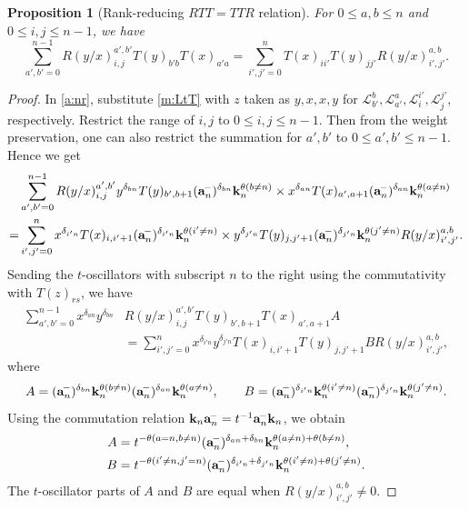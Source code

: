 \documentclass[11pt]{article}
\newtheorem{prop}[theo]{Proposition}
\theoremstyle{definition}
\numberwithin{equation}{section}
\newcommand{\am}{{\rm\aaa}^{\!-} }
\newcommand{\aaa}{\mathbf{a}}
\newcommand{\kk}{\mathbf{k}}
\begin{document}
\begin{prop}[Rank-reducing $RTT=TTR$ relation]\label{a:pr:rr}
For $0 \le a,b \le n$ and $0 \le i,j \le n-1$, we have
\begin{equation}\label{a:rrr}
\sum_{a',b'=0}^{n-1}R(y/x)_{i, j}^{a', b'}T(y)_{b'b}T(x)_{a'a}
=\sum_{i',j'=0}^nT(x)_{ii'}T(y)_{jj'}R(y/x)_{i', j'}^{a, b}.
\end{equation}
\end{prop}

\begin{proof}
In \eqref{a:nr},  
substitute \eqref{m:LtT} with $z$ taken as $y,x,x,y$ for 
$\mathcal{L}_{b'}^b,  \mathcal{L}_{a'}^a, \mathcal{L}_i^{i'}, \mathcal{L}_j^{j'}$, respectively.
Restrict the range of $i,j$ to $0\le i,j\le n-1$. 
Then from the weight preservation, one can also restrict the summation for $a',b'$ to $0\le a',b'\le n-1$.
Hence we get
\begin{align*}
&\sum_{a',b'=0}^{n-1}R(y/x)_{i, j}^{a', b'}y^{\delta_{bn}}T(y)_{b',b+1}(\am_n)^{\delta_{bn}}\kk_n^{\theta(b\ne n)}
\times x^{\delta_{an}}T(x)_{a',a+1}(\am_n)^{\delta_{an}}\kk_n^{\theta(a\ne n)}\\
=&\sum_{i',j'=0}^nx^{\delta_{i'n}}T(x)_{i,i'+1}(\am_n)^{\delta_{i'n}}\kk_n^{\theta(i'\ne n)}
\times y^{\delta_{j'n}}T(y)_{j,j'+1}(\am_n)^{\delta_{j'n}}\kk_n^{\theta(j'\ne n)}R(y/x)_{i', j'}^{a, b}.
\end{align*}
Sending the $t$-oscillators with subscript $n$ to the right using the commutativity  
with $T(z)_{rs}$, we have
\begin{align*}
\sum_{a',b'=0}^{n-1}x^{\delta_{an}}y^{\delta_{bn}} &R(y/x)_{i, j}^{a', b'}T(y)_{b',b+1}T(x)_{a',a+1} A
\\ & =\sum_{i',j'=0}^nx^{\delta_{i'n}}y^{\delta_{j'n}}T(x)_{i,i'+1}T(y)_{j,j'+1} B R(y/x)_{i', j'}^{a, b},
\end{align*}
where 
\[
A=(\am_n)^{\delta_{bn}}\kk_n^{\theta(b\ne n)}(\am_n)^{\delta_{an}}\kk_n^{\theta(a\ne n)},\qquad
B=(\am_n)^{\delta_{i'n}}\kk_n^{\theta(i'\ne n)}(\am_n)^{\delta_{j'n}}\kk_n^{\theta(j'\ne n)}.
\]
Using the commutation relation $\kk_n\am_n=t^{-1}\am_n\kk_n$, we obtain
\begin{align*}
A &=t^{-\theta(a=n,b\ne n)}(\am_n)^{\delta_{an}+\delta_{bn}}\kk_n^{\theta(a\ne n)+\theta(b\ne n)},
\\
B&=t^{-\theta(i'\ne n,j'=n)}(\am_n)^{\delta_{i'n}+\delta_{j'n}}\kk_n^{\theta(i'\ne n)+\theta(j'\ne n)}.
\end{align*}
The $t$-oscillator parts of $A$ and $B$ are equal when $R(y/x)^{a, b}_{i', j'}\ne0$.

\end{proof}
\end{document}
